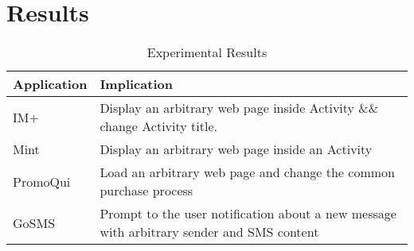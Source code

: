 \section{Results}
\label{sec:results}

\begin{table}[h]
\centering
\renewcommand{\arraystretch}{1.3}

\parbox{.85\linewidth}{
  \centering
  \caption{Experimental Results}
  \label{table:1}
  \begin{tabular}{|l|p{5cm}|}%
    \hline
    Application & Implication \\ \hline
    IM+ & Display an arbitrary web page inside Activity \&\& change Activity title. %
    \\
    Mint & Display an arbitrary web page inside an Activity \\
    PromoQui & Load an arbitrary web page and change the common purchase process \\
    GoSMS & Prompt to the user notification about a new message with arbitrary sender and SMS content \\
    \hline
  \end{tabular}
  }



\end{table}
